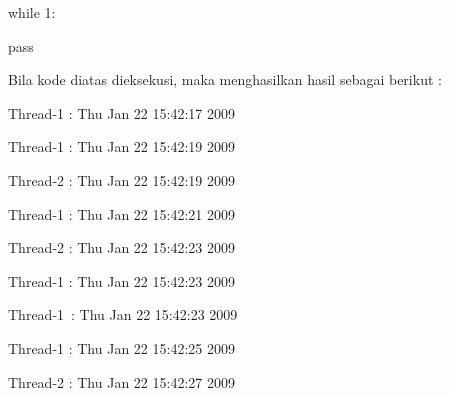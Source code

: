 \vspace{10pt}
\noindent 
{\fontsize{10pt}{10pt}\selectfont while 1:} \par
\noindent 
{\fontsize{10pt}{10pt}\selectfont pass} \par
{\fontsize{10pt}{10pt}\selectfont 
	
	
	
	\newpage
	
	Bila kode diatas dieksekusi, maka menghasilkan hasil sebagai berikut :} \par
\vspace{10pt}
\noindent 
\begin{center}{\fontsize{10pt}{10pt}\selectfont Thread-1 : Thu Jan 22 15:42:17 2009}\end{center} \par
\noindent 
\begin{center}{\fontsize{10pt}{10pt}\selectfont Thread-1 : Thu Jan 22 15:42:19 2009}\end{center} \par
\noindent 
\begin{center}{\fontsize{10pt}{10pt}\selectfont Thread-2 : Thu Jan 22 15:42:19 2009}\end{center} \par
\noindent 
\begin{center}{\fontsize{10pt}{10pt}\selectfont Thread-1 : Thu Jan 22 15:42:21 2009}\end{center} \par
\noindent 
\begin{center}{\fontsize{10pt}{10pt}\selectfont Thread-2 : Thu Jan 22 15:42:23 2009}\end{center} \par
\noindent 
\begin{center}{\fontsize{10pt}{10pt}\selectfont Thread-1 : Thu Jan 22 15:42:23 2009}\end{center} \par
\noindent 
\begin{center}{\fontsize{10pt}{10pt}\selectfont Thread-1~:  Thu Jan 22 15:42:23 2009}\end{center} \par
\noindent 
\begin{center}{\fontsize{10pt}{10pt}\selectfont Thread-1 : Thu Jan 22 15:42:25 2009}\end{center} \par
\noindent 
\begin{center}{\fontsize{10pt}{10pt}\selectfont Thread-2 : Thu Jan 22 15:42:27 2009}\end{center} \par

